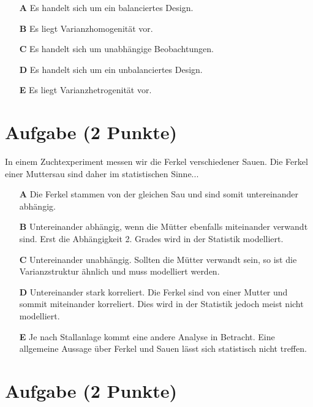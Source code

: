 \documentclass[a4paper, 9pt]{scrartcl}\usepackage[]{graphicx}\usepackage[]{xcolor}
\begin{document}
\begin{enumerate}
\item [\textbf{A} \msquare] Es handelt sich um ein balanciertes Design.
\item [\textbf{B} \msquare] Es liegt Varianzhomogenität vor.
\item [\textbf{C} \msquare] Es handelt sich um unabhängige Beobachtungen.
\item [\textbf{D} \msquare] Es handelt sich um ein unbalanciertes Design.
\item [\textbf{E} \msquare] Es liegt Varianzhetrogenität vor.
\end{enumerate}

\section{Aufgabe \hfill (2 Punkte)}



In einem Zuchtexperiment messen wir die Ferkel verschiedener Sauen. Die Ferkel einer Muttersau sind daher im statistischen Sinne...



\begin{enumerate}
\item [\textbf{A} \msquare] Die Ferkel stammen von der gleichen Sau und sind somit untereinander abhängig.
\item [\textbf{B} \msquare] Untereinander abhängig, wenn die Mütter ebenfalls miteinander verwandt sind. Erst die Abhängigkeit 2. Grades wird in der Statistik modelliert.
\item [\textbf{C} \msquare] Untereinander unabhängig. Sollten die Mütter verwandt sein, so ist die Varianzstruktur ähnlich und muss modelliert werden.
\item [\textbf{D} \msquare] Untereinander stark korreliert. Die Ferkel sind von einer Mutter und sommit miteinander korreliert. Dies wird in der Statistik jedoch meist nicht modelliert.
\item [\textbf{E} \msquare] Je nach Stallanlage kommt eine andere Analyse in Betracht. Eine allgemeine Aussage über Ferkel und Sauen lässt sich statistisch nicht treffen.
\end{enumerate}

\section{Aufgabe \hfill (2 Punkte)}
\end{document}
